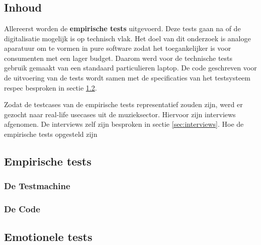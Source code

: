 
\chapter{}
\label{ch:methodologie}


\section{Inhoud}

Allereerst worden de \textbf{empirische tests} uitgevoerd. Deze tests gaan na of de digitalisatie mogelijk is op technisch vlak. Het doel van dit onderzoek is analoge aparatuur om te vormen in pure software zodat het toegankelijker is voor consumenten met een lager budget. Daarom werd voor de technische tests gebruik gemaakt van een standaard particulieren laptop. De code geschreven voor de uitvoering van de tests wordt samen met de specificaties van het testsysteem respec besproken in sectie \ref{sec:methodologie:empirischetests}.

Zodat de testcases van de empirische tests representatief zouden zijn, werd er gezocht naar real-life usecases uit de muzieksector. Hiervoor zijn interviews afgenomen. De interviews zelf zijn besproken in sectie \ref{sec:interviews}. Hoe de empirische tests opgesteld zijn

\section{Empirische tests}
\label{sec:methodologie:empirischetests}

\subsection{De Testmachine}

\subsection{De Code}

\section{Emotionele tests}

\iffalse \lipsum[21-25] \fi

